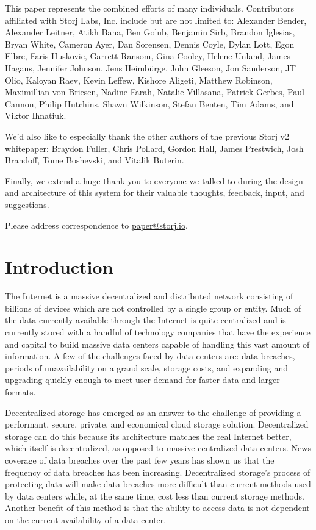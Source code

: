 \documentclass[11pt,fleqn,openany]{book}
\begin{document}
This paper represents the combined efforts of many individuals.
Contributors affiliated with Storj Labs, Inc. include but are not limited to:
Alexander Bender,
Alexander Leitner,
Atikh Bana,
Ben Golub,
Benjamin Sirb,
Brandon Iglesias,
Bryan White,
Cameron Ayer,
Dan Sorensen,
Dennis Coyle,
Dylan Lott,
Egon Elbre,
Faris Huskovic,
Garrett Ransom,
Gina Cooley,
Helene Unland,
James Hagans,
Jennifer Johnson,
Jens Heimbürge,
John Gleeson,
Jon Sanderson,
JT Olio,
Kaloyan Raev,
Kevin Leffew,
Kishore Aligeti,
Matthew Robinson,
Maximillian von Briesen,
Nadine Farah,
Natalie Villasana,
Patrick Gerbes,
Paul Cannon,
Philip Hutchins,
Shawn Wilkinson,
Stefan Benten,
Tim Adams,
and Viktor Ihnatiuk.

We'd also like to especially thank the other authors of the previous
Storj v2 whitepaper:
Braydon Fuller,
Chris Pollard,
Gordon Hall,
James Prestwich,
Josh Brandoff,
Tome Boshevski,
and Vitalik Buterin.

Finally, we extend a huge thank you to everyone we talked to during the
design and architecture of this system for their valuable thoughts, feedback,
input, and suggestions.

Please address correspondence to \href{mailto:paper@storj.io}{paper@storj.io}.

\chapter{Introduction}\label{chap:intro}

The Internet is a massive decentralized and distributed network consisting of
billions of devices which are not controlled by a single group or entity.
Much of the data currently available through the Internet is quite centralized and is currently stored with a handful of technology companies that have the
experience and capital to build massive data centers capable of handling this
vast amount of information.
A few of the challenges faced by data centers are: data breaches, periods of
unavailability on a grand scale, storage costs, and expanding and upgrading quickly enough to meet user demand for faster data and larger formats.

Decentralized storage has emerged as an answer to the challenge of
providing a performant, secure, private, and economical cloud storage solution.
Decentralized storage can do this because its architecture matches the real
Internet better, which itself is decentralized, as opposed to massive
centralized data centers. News coverage of data breaches over the past few years has shown us that the frequency of data breaches has been increasing. Decentralized storage's process of protecting data will make data breaches more difficult than current methods used by data centers while, at the same time, cost less than current storage methods. Another benefit of this method is that the ability to access data is not dependent on the current availability of a data center. 
\end{document}

